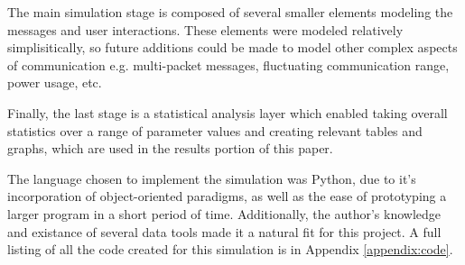 The main simulation stage is composed of several smaller elements modeling
the messages and user interactions.
These elements were modeled relatively simplisitically, so future additions could be
made to model other complex aspects of communication e.g. multi-packet messages,
fluctuating communication range, power usage, etc.

Finally, the last stage is a statistical analysis layer which enabled taking overall
statistics over a range of parameter values and creating relevant tables and graphs,
which are used in the results portion of this paper.

The language chosen to implement the simulation was Python, due to it's incorporation of 
object-oriented paradigms, as well as the ease of prototyping a larger program in a 
short period of time.
Additionally, the author's knowledge and existance of several data tools made it a natural
fit for this project.
A full listing of all the code created for this simulation is in Appendix \ref{appendix:code}.
